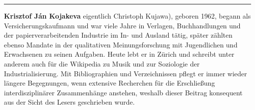 \begin{center}\rule{0.5\linewidth}{\linethickness}\end{center}

\textbf{Krisztof Ján Kojakeva} eigentlich Christoph Kujawa), geboren 1962,
begann als Versicherungskaufmann und war viele Jahre in Verlagen,
Buchhandlungen und der papierverarbeitenden Industrie im In- und Ausland
tätig, später zählten ebenso Mandate in der qualitativen
Meinungsforschung mit Jugendlichen und Erwachsenen zu seinen Aufgaben.
Heute lebt er in Zürich und schreibt unter anderem auch für die Wikipedia zu
Musik und zur Soziologie der Industrialisierung. Mit Bibliographien und
Verzeichnissen pflegt er immer wieder längere Begegnungen, wenn
extensive Recherchen für die Erschließung interdisziplinärer
Zusammenhänge anstehen, weshalb dieser Beitrag konsequent aus der Sicht
des Lesers geschrieben wurde.